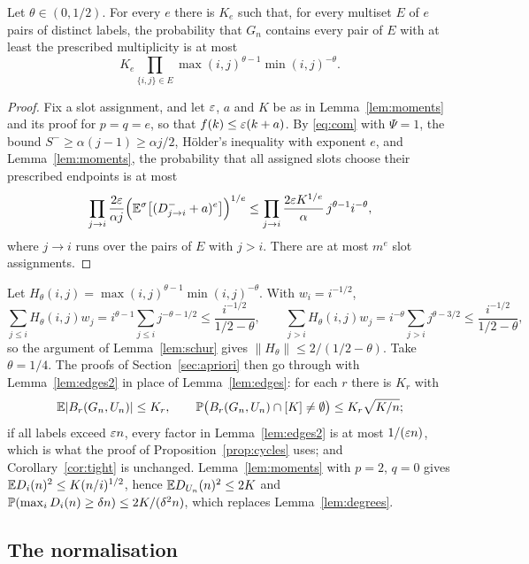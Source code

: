 \begin{lemma}\label{lem:edges2}
Let $\theta\in(0,1/2)$. For every $e$ there is $K_e$ such that, for every multiset $E$ of $e$ pairs of distinct
labels, the probability that $G_n$ contains every pair of $E$ with at least the prescribed multiplicity is at most
\[
    K_e\prod_{\{i,j\}\in E}\max(i,j)^{\theta-1}\min(i,j)^{-\theta}.
\]
\end{lemma}

\begin{proof}
Fix a slot assignment, and let $\varepsilon$, $a$ and $K$ be as in Lemma~\ref{lem:moments} and its proof for $p=q=e$,
so that $f(k)\le\varepsilon(k+a)$. By \eqref{eq:com} with $\Psi=1$, the bound $S^-\ge\alpha(j-1)\ge\alpha j/2$,
H\"older's inequality with exponent $e$, and Lemma~\ref{lem:moments}, the
probability that all assigned slots choose their prescribed endpoints is at most
\[
    \prod_{j\to i}\frac{2\varepsilon}{\alpha j}\Bigl(\mathbb{E}^\sigma\bigl[(D^-_{j\to i}+a)^e\bigr]\Bigr)^{1/e}
    \le\prod_{j\to i}\frac{2\varepsilon K^{1/e}}{\alpha}\,j^{\theta-1}i^{-\theta},
\]
where $j\to i$ runs over the pairs of $E$ with $j>i$. There are at most $m^e$ slot assignments.
\end{proof}

Let $H_\theta(i,j)=\max(i,j)^{\theta-1}\min(i,j)^{-\theta}$. With $w_i=i^{-1/2}$,
\[
   \sum_{j\le i}H_\theta(i,j)w_j=i^{\theta-1}\sum_{j\le i}j^{-\theta-1/2}\le\frac{i^{-1/2}}{1/2-\theta},\qquad
   \sum_{j>i}H_\theta(i,j)w_j=i^{-\theta}\sum_{j>i}j^{\theta-3/2}\le\frac{i^{-1/2}}{1/2-\theta},
\]
so the argument of Lemma~\ref{lem:schur} gives $\|H_\theta\|\le2/(1/2-\theta)$. Take $\theta=1/4$. The proofs of
Section~\ref{sec:apriori} then go through with Lemma~\ref{lem:edges2} in place of Lemma~\ref{lem:edges}: for each
$r$ there is $K_r$ with
\[
    \mathbb{E}|B_r(G_n,U_n)|\le K_r,\qquad \mathbb{P}\bigl(B_r(G_n,U_n)\cap[K]\ne\emptyset\bigr)\le K_r\sqrt{K/n};
\]
if all labels exceed $\varepsilon n$, every factor in Lemma~\ref{lem:edges2} is at most $1/(\varepsilon n)$, which is what the
proof of Proposition~\ref{prop:cycles} uses; and Corollary~\ref{cor:tight} is unchanged. Lemma~\ref{lem:moments}
with $p=2$, $q=0$ gives $\mathbb{E} D_i(n)^2\le K(n/i)^{1/2}$, hence $\mathbb{E} D_{U_n}(n)^2\le2K$ and
$\mathbb{P}(\max_iD_i(n)\ge\delta n)\le2K/(\delta^2n)$, which replaces Lemma~\ref{lem:degrees}.

\subsection{The normalisation}

